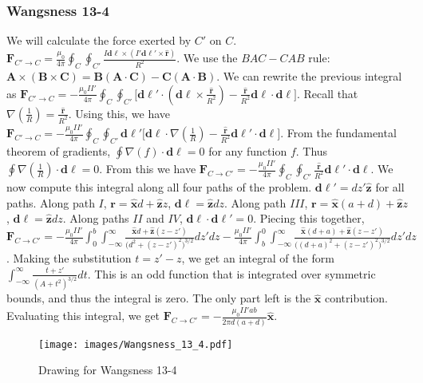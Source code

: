             \subsubsection{Wangsness 13-4}
            We will calculate the force exerted by $C'$ on $C$. $\mathbf{F}_{C'\rightarrow C} = \frac{\mu_0}{4\pi} \oint_{C} \oint_{C'} \frac{I \mathbf{d\ell}\times (I' \mathbf{d\ell}'\times \hat{\mathbf{r}})}{R^2}$. We use the $BAC-CAB$ rule: $\mathbf{A}\times(\mathbf{B}\times \mathbf{C}) = \mathbf{B}(\mathbf{A}\cdot \mathbf{C}) - \mathbf{C}(\mathbf{A}\cdot \mathbf{B})$. We can rewrite the previous integral as  $\mathbf{F}_{C'\rightarrow C} = -\frac{\mu_0 II'}{4\pi} \oint_{C} \oint_{C'} \big[ \mathbf{d\ell}'\cdot(\mathbf{d\ell}\times \frac{\hat{\mathbf{r}}}{R^2}) - \frac{\hat{\mathbf{r}}}{R^2} \mathbf{d\ell}\cdot \mathbf{d\ell}\big]$. Recall that $\nabla(\frac{1}{R}) = \frac{\hat{\mathbf{r}}}{R^2}$. Using this, we have $\mathbf{F}_{C'\rightarrow C} = -\frac{\mu_0 II'}{4\pi} \oint_{C}\oint_{C'} \mathbf{d\ell'}\big[ \mathbf{d\ell}\cdot \nabla(\frac{1}{R})- \frac{\hat{\mathbf{r}}}{R^2} \mathbf{d\ell'} \cdot \mathbf{d\ell}\big]$. From the fundamental theorem of gradients, $\oint \nabla(f) \cdot \mathbf{d\ell} = 0$ for any function $f$. Thus $\oint \nabla(\frac{1}{R}) \cdot \mathbf{d\ell} = 0$. From this we have $\mathbf{F}_{C\rightarrow C'} = -\frac{\mu_0 II'}{4\pi} \oint_{C}\oint_{C'} \frac{\hat{\mathbf{r}}}{R^2} \mathbf{d\ell}'\cdot \mathbf{d\ell}$. We now compute this integral along all four paths of the problem. $\mathbf{d\ell}' = dz' \hat{\mathbf{z}}$ for all paths. Along path $I$, $\mathbf{r} = \hat{\mathbf{x}}d+\hat{\mathbf{z}}z$, $\mathbf{d\ell} = \hat{\mathbf{z}}dz$. Along path $III$, $\mathbf{r} = \hat{\mathbf{x}}(a+d)+\hat{\mathbf{z}}z$, $\mathbf{d\ell} = \hat{\mathbf{z}}dz$. Along paths $II$ and $IV$, $\mathbf{d\ell}\cdot \mathbf{d\ell}' = 0$. Piecing this together, $\mathbf{F}_{C\rightarrow C'} = -\frac{\mu_0 II'}{4\pi}\int_{0}^{b} \int_{-\infty}^{\infty} \frac{\hat{\mathbf{x}}d+\hat{\mathbf{z}}(z-z')}{\big(d^2+(z-z')^2\big)^{3/2}}dz'dz - \frac{\mu_0 II'}{4\pi} \int_{b}^{0} \int_{-\infty}^{\infty} \frac{\hat{\mathbf{x}}(d+a)+\hat{\mathbf{z}}(z-z')}{\big((d+a)^2+(z-z')^2\big)^{3/2}}dz'dz$. Making the substitution $t=z'-z$, we get an integral of the form $\int_{-\infty}^{\infty} \frac{t+z'}{(A+t^2)^{3/2}}dt$. This is an odd function that is integrated over symmetric bounds, and thus the integral is zero. The only part left is the $\hat{\mathbf{x}}$ contribution. Evaluating this integral, we get $\mathbf{F}_{C\rightarrow C'} = -\frac{\mu_0 II' ab}{2\pi d(a+d)}\hat{\mathbf{x}}$.
            \begin{figure}[htbp]
                \centering
                \captionsetup{type=figure}
                \texttt{[image: images/Wangsness\_13\_4.pdf]}
                \caption{Drawing for Wangsness 13-4}
            \end{figure}
